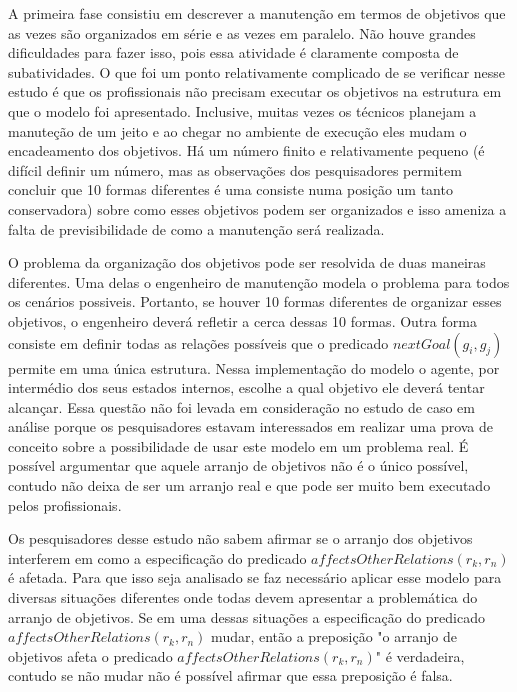 A primeira fase consistiu em descrever a manutenção em termos de objetivos que as vezes são organizados em série e as vezes em paralelo. Não houve grandes dificuldades para fazer isso, 
pois essa atividade é claramente composta de subatividades. O que foi um ponto relativamente complicado de se verificar nesse estudo é que os profissionais não precisam executar os objetivos na 
estrutura em que o modelo foi apresentado. Inclusive, muitas vezes os técnicos planejam a manuteção de um jeito e ao chegar no ambiente de execução eles mudam o encadeamento dos objetivos. 
Há um número finito e relativamente pequeno (é difícil definir um número, mas as observações dos pesquisadores permitem concluir que 10 formas diferentes é uma consiste numa posição um tanto 
conservadora) sobre como esses objetivos podem ser organizados e isso ameniza a falta de previsibilidade de como a manutenção será realizada. 

O problema da organização dos objetivos pode ser resolvida de duas maneiras diferentes. Uma delas o engenheiro de manutenção modela o problema para todos os cenários possiveis. Portanto, 
se houver 10 formas diferentes de organizar esses objetivos, o engenheiro deverá refletir a cerca dessas 10 formas. Outra forma consiste em definir todas as relações possíveis que o predicado 
$nextGoal(g_i,g_j)$ permite em uma única estrutura. Nessa implementação do modelo o agente, por intermédio dos seus estados internos, escolhe a qual objetivo ele deverá tentar alcançar. Essa 
questão não foi levada em consideração no estudo de caso em análise porque os pesquisadores estavam interessados em realizar uma prova de conceito sobre a possibilidade de usar este modelo 
em um problema real. É possível argumentar que aquele arranjo de objetivos não é o único possível, contudo não deixa de ser um arranjo real e que pode ser muito bem executado pelos profissionais. 

Os pesquisadores desse estudo não sabem afirmar se o arranjo dos objetivos interferem em como a especificação do predicado $affectsOtherRelations(r_k,r_n)$ é afetada. Para que isso seja 
analisado se faz necessário aplicar esse modelo para diversas situações diferentes onde todas devem apresentar a problemática do arranjo de objetivos. Se em uma dessas situações a especificação 
do predicado $affectsOtherRelations(r_k,r_n)$ mudar, então a preposição "o arranjo de objetivos afeta o predicado $affectsOtherRelations(r_k,r_n)$" é verdadeira, contudo se não mudar não é 
possível afirmar que essa preposição é falsa. 

